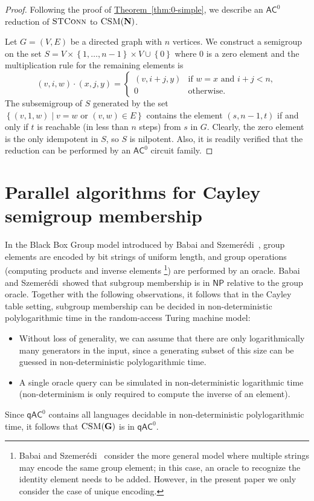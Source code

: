 \documentclass[11pt]{article}
\numberwithin{equation}{section}
\theoremstyle{definition}
\theoremstyle{plain}
\newcommand{\expref}[2]{\hyperref[#2]{#1~\ref{#2}}}
\newcommand{\union}{\mathbin{\cup}}
\newcommand{\set}[2]{\ensuremath{\left\{#1 \mid #2\right\}}}
\newcommand{\os}[1]{\ensuremath{\left\{#1\right\}}}
\newcommand{\AC}{\ensuremath{\mathsf{AC}}}
\newcommand{\qAC}{\ensuremath{\mathsf{qAC}}}
\newcommand{\NP}{\ensuremath{\mathsf{NP}}}
\newcommand{\vNil}{\mathbf{N}}
\newcommand{\vG}{\mathbf{G}}
\newcommand{\CSM}{\ensuremath{\textsc{CSM}}}
\newcommand{\STCONN}{\ensuremath{\textsc{STConn}}}
\newcommand{\SCSM}{Cayley semigroup membership}
\newcommand{\Szemeredi}{Szemer{\'e}di}
\begin{document}
\begin{proof}
  Following the proof of \expref{Theorem}{thm:0-simple}, we describe an $\AC^0$
  reduction of $\STCONN$ to $\CSM(\vNil)$.

  Let $G = (V, E)$ be a directed graph with $n$ vertices.
  We construct a semigroup on the set $S = V \times \os{1, \dots, n-1} \times V
  \union \os{0}$ where $0$ is a zero element and the multiplication rule for
  the remaining elements is
  \begin{equation*}
    (v, i, w) \cdot (x, j, y) =
    \begin{cases}
      (v, i + j, y) & \text{if $w = x$ and $i + j < n$}, \\
      0 & \text{otherwise}.
    \end{cases}
  \end{equation*}
  The subsemigroup of $S$ generated by the set $\set{(v, 1, w)}{v = w
  \text{~or~} (v, w) \in E}$ contains the element $(s, n-1, t)$ if and only if
  $t$ is reachable (in less than $n$ steps) from $s$ in $G$.
  Clearly, the zero element is the only idempotent in $S$, so $S$ is nilpotent.
  Also, it is readily verified that the reduction can be performed by an
  $\AC^0$ circuit family.
\end{proof}

%
\section{Parallel algorithms for {\SCSM}}  %
\label{sec:parallel-alg}

In the Black Box Group model introduced by Babai and
\Szemeredi~\cite{BabaiS84}, %
group elements  %
are encoded by
%
bit strings of uniform length,  %
and group
operations (computing products and inverse elements%
%
\footnote{Babai and \Szemeredi~\cite{BabaiS84} consider the more general
model where multiple strings may encode the same group
element; in this case, an oracle to recognize the identity
element needs to be added.  However, in the present paper we only
consider the case of unique encoding.})  %
are performed by an
oracle. Babai and \Szemeredi\ showed that subgroup membership
is in $\NP$ relative to the group oracle.
%
Together with the following observations, it follows that in the Cayley table
setting, subgroup membership can be decided in non-deterministic
polylogarithmic time in the random-access Turing machine model:
%
\begin{itemize}
  \item Without loss of generality, we can assume that there are only
    logarithmically many generators in the input, since a generating subset
    of this size can be guessed in non-deterministic polylogarithmic time.
    
  \item A single oracle query can be simulated in non-deterministic logarithmic
    time (non-determinism is only required to compute the inverse of an
    element).
\end{itemize}
%
Since $\qAC^0$ contains all languages decidable in non-deterministic
polylogarithmic time, it follows that $\CSM(\vG)$ is in $\qAC^0$.
\end{document}
